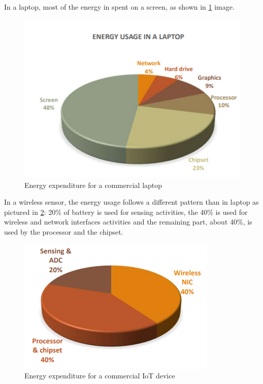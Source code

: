 \documentclass[10pt,a4paper]{report}
\theoremstyle{definition}
\begin{document}
In a laptop, most of the energy in spent on a screen, as shown in \ref{laptop-usage} image.
\begin{figure}[h]
	\centering\includegraphics[scale=0.50]{images/Pasted image 20230324162704.png}
	\caption{Energy expenditure for a commercial laptop}
	\label{laptop-usage}
\end{figure}

In a wireless sensor, the energy usage follows a different pattern than in laptop as pictured in \ref{iot-usage}: 20\% of battery is used for sensing activities, the 40\% is used for wireless and network interfaces activities and the remaining part, about 40\%, is used by the processor and the chipset.
\begin{figure}[h!]
	\centering\includegraphics[scale=0.50]{images/Pasted image 20230324162732.png}
	\caption{Energy expenditure for a commercial IoT device}
	\label{iot-usage}
\end{figure}
\end{document}
